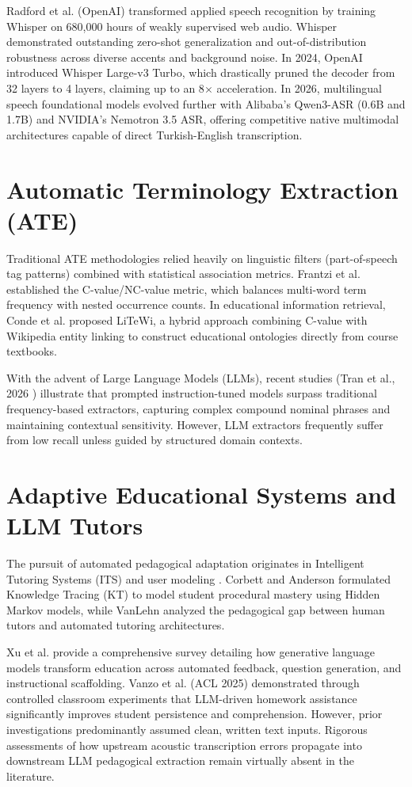 \documentclass[a4paper,12pt]{report}
\begin{document}
Radford et al. (OpenAI) \cite{radford2023} transformed applied speech recognition by training Whisper on 680,000 hours of weakly supervised web audio. Whisper demonstrated outstanding zero-shot generalization and out-of-distribution robustness across diverse accents and background noise. In 2024, OpenAI introduced Whisper Large-v3 Turbo, which drastically pruned the decoder from 32 layers to 4 layers, claiming up to an 8$\times$ acceleration. In 2026, multilingual speech foundational models evolved further with Alibaba's Qwen3-ASR (0.6B and 1.7B) \cite{qwen3asr2026} and NVIDIA's Nemotron 3.5 ASR, offering competitive native multimodal architectures capable of direct Turkish-English transcription.

\section{Automatic Terminology Extraction (ATE)}
Traditional ATE methodologies relied heavily on linguistic filters (part-of-speech tag patterns) combined with statistical association metrics. Frantzi et al. \cite{frantzi2000} established the C-value/NC-value metric, which balances multi-word term frequency with nested occurrence counts. In educational information retrieval, Conde et al. \cite{conde2016} proposed LiTeWi, a hybrid approach combining C-value with Wikipedia entity linking to construct educational ontologies directly from course textbooks.

With the advent of Large Language Models (LLMs), recent studies (Tran et al., 2026 \cite{tran2026}) illustrate that prompted instruction-tuned models surpass traditional frequency-based extractors, capturing complex compound nominal phrases and maintaining contextual sensitivity. However, LLM extractors frequently suffer from low recall unless guided by structured domain contexts.

\section{Adaptive Educational Systems and LLM Tutors}
The pursuit of automated pedagogical adaptation originates in Intelligent Tutoring Systems (ITS) and user modeling \cite{brusilovsky2007}. Corbett and Anderson \cite{corbett1995} formulated Knowledge Tracing (KT) to model student procedural mastery using Hidden Markov models, while VanLehn \cite{vanlehn2011} analyzed the pedagogical gap between human tutors and automated tutoring architectures.

Xu et al. \cite{xu2024} provide a comprehensive survey detailing how generative language models transform education across automated feedback, question generation, and instructional scaffolding. Vanzo et al. (ACL 2025) \cite{vanzo2025} demonstrated through controlled classroom experiments that LLM-driven homework assistance significantly improves student persistence and comprehension. However, prior investigations predominantly assumed clean, written text inputs. Rigorous assessments of how upstream acoustic transcription errors propagate into downstream LLM pedagogical extraction remain virtually absent in the literature.
\end{document}
